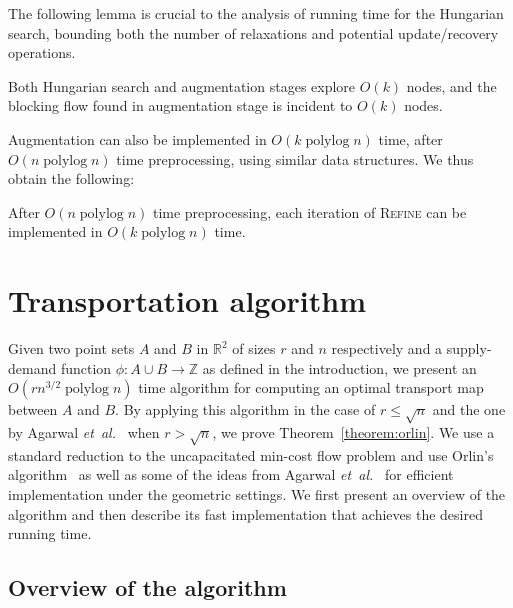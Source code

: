 \documentclass[11pt,twoside]{article}
\def\etal{\emph{et~al.}}
\def\etal{\textit{et~al.}}
\def\polylog{\mathop{\mathrm{polylog}}}
\def\reals{\mathbb{R}}
\def\ints{\mathbb{Z}}
\def\tsupply{\phi}
\theoremstyle{plain}
\numberwithin{figure}{section}
\begin{document}
The following lemma is crucial to the analysis of running time for the Hungarian search,
bounding both the number of relaxations and potential update/recovery operations.

\begin{lemma}
\label{lemma:cost_scale_count}
Both Hungarian search and augmentation stages explore $O(k)$ nodes,
and the blocking flow found in augmentation stage is incident to $O(k)$ nodes.
\end{lemma}

Augmentation can also be implemented in $O(k\polylog n)$ time, after
$O(n\polylog n)$ time preprocessing, using similar data structures.
We thus obtain the following:

\begin{lemma}
\label{lemma:refine_iter_time}
After $O(n\polylog n)$ time preprocessing, each iteration of \textsc{Refine} can be
implemented in $O(k\polylog n)$ time.
\end{lemma}


\section{Transportation algorithm}
\label{section:orlin}

Given two point sets $A$ and $B$ in $\reals^2$ of sizes $r$ and $n$ respectively
and a supply-demand function $\tsupply: A \cup B \to \ints$
as defined in the introduction, we present an $O(rn^{3/2}\polylog n)$ time
algorithm for computing an optimal transport map between $A$ and $B$.
By applying this algorithm in the case of $r \leq \sqrt{n}$ and the one by
Agarwal \etal~\cite{AFPVX17arxiv} when $r > \sqrt{n}$, we prove Theorem~\ref{theorem:orlin}.
We use a standard reduction to the uncapacitated min-cost flow problem and use
Orlin's algorithm~\cite{O93} as well as some of
the ideas from Agarwal \etal~\cite{AFPVX17arxiv} for efficient implementation under the geometric settings.
We first present an overview of the algorithm and then describe its fast
implementation that achieves the desired running time.

\subsection{Overview of the algorithm}
\end{document}
